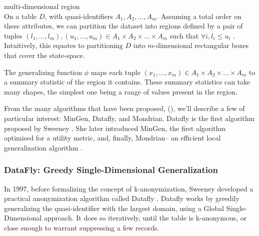\begin{definition}{multi-dimensional region} \\
On a table $D$, with quasi-identifiers $A_1, A_2, ..., A_m$. Assuming a total order on these attributes, we can partition the dataset into regions defined by a pair of tuples $(l_1, ..., l_m),(u_1,...,u_m) \in A_1\times A_2\times ... \times A_m$ such that $\forall i, l_i \leq u_i$ \cite{mondrian}. Intuitively, this equates to partitioning $D$ into $m$-dimensional rectangular boxes that cover the state-space. 

The generalizing function $\phi$ maps each tuple $(x_1, ..., x_m) \in A_1\times A_2\times ... \times A_m$ to a summary statistic of the region it contains. These summary statistics can take many shapes, the simplest one being a range of values present in the region. 
\end{definition}

From the many algorithms that have been proposed, (\cite{ola_algo}\cite{mondrian}\cite{incognito}\cite{kanon_algos}), we'll describe a few of particular interest: MinGen, Datafly, and Mondrian. Datafly is the first algorithm proposed by Sweeney \cite{sweeney_datafly}. She later introduced MinGen, the first algorithm optimised for a utility metric,  and, finally, Mondrian-- an efficient local generalization algorithm \cite{mondrian}. 

\subsubsection{DataFly: Greedy Single-Dimensional Generalization}
In 1997, before formalizing the concept of k-anonymization, Sweeney developed a practical anonymization algorithm called Datafly \cite{sweeney_datafly}. Datafly works by greedily generalizing the quasi-identifier with the largest domain, using a Global Single-Dimensional approach. It does so iteratively, until the table is k-anonymous, or close enough to warrant suppressing a few records. 

